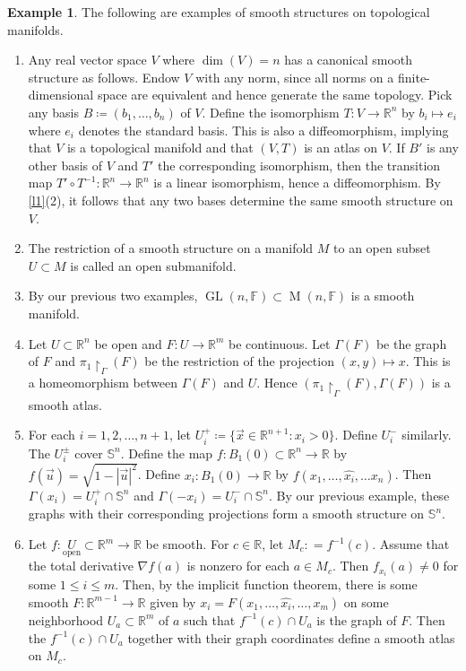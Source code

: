 \documentclass[10pt,letterpaper,cm]{nupset}
\theoremstyle{definition}
\newtheorem{exmp}[definition]{Example}
\theoremstyle{theorem}
\theoremstyle{remark}
\newcommand{\F}{\mathbb F}
\newcommand{\R}{\mathbb R}
\renewcommand{\S}{\mathbb S}
\newcommand{\1}{\mathbf{1}}
\renewcommand{\u}{\vec u}
\newcommand{\x}{\vec x}
\newcommand{\0}{\vec 0}
\DeclareMathOperator{\GL}{GL}
\DeclareMathOperator{\M}{M}
\begin{document}
\begin{exmp}{The following are examples of smooth structures on topological manifolds.}
\begin{enumerate}
\item Any real vector space $V$ where $\dim(V) = n$ has a canonical smooth structure as follows. Endow $V$ with any norm, since all norms on a finite-dimensional space are equivalent and hence generate the same topology. Pick any basis $B\coloneqq  (b_1, \ldots, b_n)$ of $V$.  Define the isomorphism  $T: V \to \R^n$ by $b_i \mapsto e_i$ where $e_i$ denotes the standard basis. This is also a diffeomorphism, implying that $V$ is a topological manifold and that $(V, T)$ is an atlas on $V$. If $B'$ is any other basis of $V$ and $T'$ the corresponding isomorphism, then the transition map $T' \circ T^{-1}: \R^n \to \R^n$ is a linear isomorphism, hence a diffeomorphism. By \cref{l1}(2), it follows that any two bases determine the same smooth structure on $V$. 
\item The restriction of a smooth structure on  a manifold $M$ to an open subset $U \subset M$ is called an open submanifold. 
\item By our previous two examples, $\GL(n, \F) \subset \M(n, \F)$ is a smooth manifold.
\item Let $U\subset \R^n$ be open and $F: U \to \R^m$ be continuous. Let $\Gamma(F)$ be the graph of $F$ and $\pi_1\restriction_\Gamma(F)$ be the restriction of the projection $(x, y)\mapsto x$. This is a homeomorphism between $\Gamma(F)$ and $U$. Hence $(\pi_1 \restriction_\Gamma(F), \Gamma(F))$ is a smooth atlas.
\item For each $i = 1, 2, \ldots, n+1$, let $U_i^+ \coloneqq  \{ \x \in \R^{n+1}: x_i >0\}$. Define $U_i^-$ similarly. The $U_i^{\pm}$ cover $\S^n$. Define the map $f: B_1(0)\subset \R^n \to \R$ by $f(\u) = \sqrt{1 - |\u|^2}$. Define $x_i: B_1(0) \to \R$ by $f(x_1, \ldots, \widehat{x_i}, \ldots x_n)$.  Then $\Gamma(x_i) = U_i^+ \cap \S^n$ and $\Gamma(-x_i) = U_i^- \cap \S^n$. By our previous example, these graphs with their corresponding projections form a smooth structure on $\S^n$.
\item Let $f: \underset{\text{open}}U\subset \R^m \to \R$ be smooth. For $c \in \R$, let $M_c: = f^{-1}(c)$. Assume that the total derivative $\nabla f(a)$ is nonzero for each $a \in M_c$.  Then $f_{x_i}(a) \ne 0$ for some $1 \leq i \leq m$. Then, by the implicit function theorem, there is some smooth $F: \R^{m-1} \to \R$ given by $x_i = F(x_1, \ldots, \widehat{x_i}, \ldots, x_m)$ on some neighborhood $U_a\subset \R^m$ of $a$ such that $f^{-1}(c) \cap U_a$ is the graph of $F$.  Then the $f^{-1}(c) \cap U_a$ together with their graph coordinates define a smooth atlas on $M_c$.

\end{enumerate}
\end{exmp}
\end{document}
